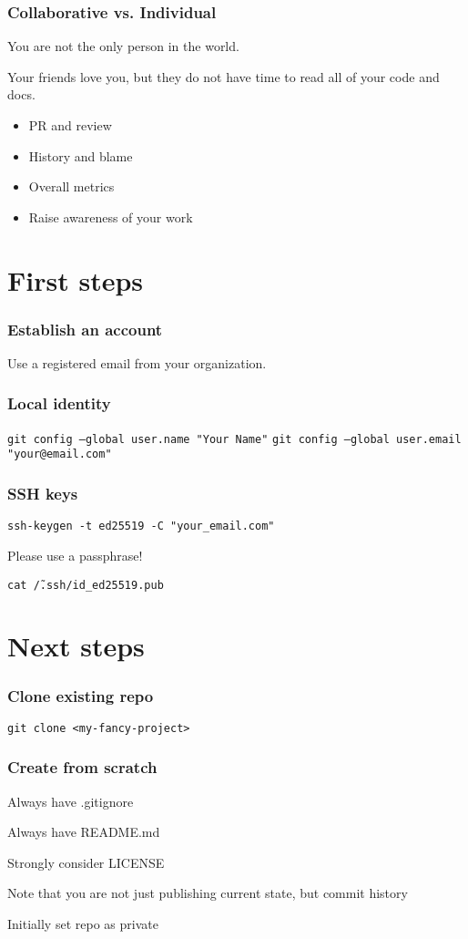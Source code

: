 \documentclass{beamer}
\begin{document}
\frame
{
   \frametitle{Collaborative vs. Individual}

    You are not the only person in the world.

    Your friends love you, but they do not have time to read all of your code and docs.

   \begin{itemize}
      \item<1-> PR and review

      \item<2-> History and blame

      \item<3-> Overall metrics

      \item<4-> Raise awareness of your work

   \end{itemize}

}

\section{First steps}

\frame
{
   \frametitle{Establish an account}

    Use a registered email from your organization.
}

\frame
{
   \frametitle{Local identity}

   \texttt{git config --global user.name "Your Name"}
   \texttt{git config --global user.email "your@email.com"}

}

\frame
{
   \frametitle{SSH keys}

   \texttt{ssh-keygen -t ed25519 -C "your\_email\@example.com"}

   Please use a passphrase!

   \texttt{cat \~/.ssh/id\_ed25519.pub}

}

\section{Next steps}


\frame
{
   \frametitle{Clone existing repo}

   \texttt{git clone <my-fancy-project>}

}

\frame
{
   \frametitle{Create from scratch}

   Always have .gitignore

    Always have README.md

    Strongly consider LICENSE

    Note that you are not just publishing current state, but commit history

    Initially set repo as private

}
\end{document}
